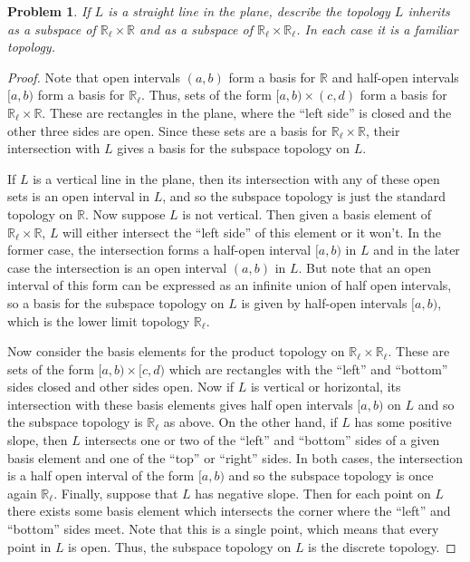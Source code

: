 \documentclass{article}
\newtheorem{problem}{Problem}
\begin{document}
\begin{problem}
If $L$ is a straight line in the plane, describe the topology $L$ inherits as a subspace of $\mathbb{R}_{\ell} \times \mathbb{R}$ and as a subspace of $\mathbb{R}_{\ell} \times \mathbb{R}_{\ell}$. In each case it is a familiar topology.
\end{problem}
\begin{proof}
Note that open intervals $(a,b)$ form a basis for $\mathbb{R}$ and half-open intervals $[a,b)$ form a basis for $\mathbb{R}_{\ell}$. Thus, sets of the form $[a,b) \times (c,d)$ form a basis for $\mathbb{R}_{\ell} \times \mathbb{R}$. These are rectangles in the plane, where the ``left side'' is closed and the other three sides are open. Since these sets are a basis for $\mathbb{R}_{\ell} \times \mathbb{R}$, their intersection with $L$ gives a basis for the subspace topology on $L$.

If $L$ is a vertical line in the plane, then its intersection with any of these open sets is an open interval in $L$, and so the subspace topology is just the standard topology on $\mathbb{R}$. Now suppose $L$ is not vertical. Then given a basis element of $\mathbb{R}_{\ell} \times \mathbb{R}$, $L$ will either intersect the ``left side'' of this element or it won't. In the former case, the intersection forms a half-open interval $[a,b)$ in $L$ and in the later case the intersection is an open interval $(a,b)$ in $L$. But note that an open interval of this form can be expressed as an infinite union of half open intervals, so a basis for the subspace topology on $L$ is given by half-open intervals $[a,b)$, which is the lower limit topology $\mathbb{R}_{\ell}$.

Now consider the basis elements for the product topology on $\mathbb{R}_{\ell} \times \mathbb{R}_{\ell}$. These are sets of the form $[a,b) \times [c,d)$ which are rectangles with the ``left'' and ``bottom'' sides closed and other sides open. Now if $L$ is vertical or horizontal, its intersection with these basis elements gives half open intervals $[a,b)$ on $L$ and so the subspace topology is $\mathbb{R}_{\ell}$ as above. On the other hand, if $L$ has some positive slope, then $L$ intersects one or two of the ``left'' and ``bottom'' sides of a given basis element and one  of the ``top'' or ``right'' sides. In both cases, the intersection is a half open interval of the form $[a,b)$ and so the subspace topology is once again $\mathbb{R}_{\ell}$. Finally, suppose that $L$ has negative slope. Then for each point on $L$ there exists some basis element which intersects the corner where the ``left'' and ``bottom'' sides meet. Note that this is a single point, which means that every point in $L$ is open. Thus, the subspace topology on $L$ is the discrete topology.
\end{proof}
\end{document}
